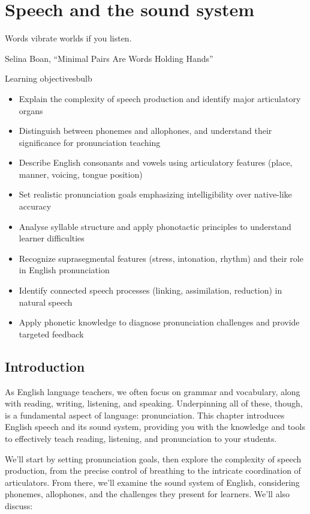 \chapter{Speech and the sound system}\label{ch:sound}

\epigraph{Words vibrate worlds if you listen.}{Selina Boan, ``Minimal Pairs Are Words Holding Hands''}

\begin{tblsframedsymbol}{Learning objectives}{bulb}
\begin{itemize}[noitemsep, leftmargin=*]
    \item Explain the complexity of speech production and identify major articulatory organs
    \item Distinguish between phonemes and allophones, and understand their significance for pronunciation teaching
    \item Describe English consonants and vowels using articulatory features (place, manner, voicing, tongue position)
    \item Set realistic pronunciation goals emphasizing intelligibility over native-like accuracy
    \item Analyse syllable structure and apply phonotactic principles to understand learner difficulties
    \item Recognize suprasegmental features (stress, intonation, rhythm) and their role in English pronunciation
    \item Identify connected speech processes (linking, assimilation, reduction) in natural speech
    \item Apply phonetic knowledge to diagnose pronunciation challenges and provide targeted feedback
\end{itemize}
\end{tblsframedsymbol}

\section{Introduction}

As English language teachers, we often focus on grammar and vocabulary, along with reading, writing, listening, and speaking. Underpinning all of these, though, is a fundamental aspect of language: pronunciation. This chapter introduces English speech and its sound system, providing you with the knowledge and tools to effectively teach reading, listening, and pronunciation to your students.

We'll start by setting pronunciation goals, then explore the complexity of speech production, from the precise control of breathing to the intricate coordination of articulators. From there, we'll examine the sound system of English, considering phonemes, allophones, and the challenges they present for learners. We'll also discuss:


